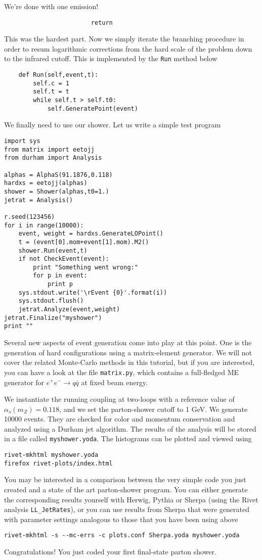 \documentclass[10pt,fleqn]{scrartcl}
\begin{document}
 We're done with one emission!
\begin{verbatim}
                        return    
\end{verbatim}
This was the hardest part. Now we simply iterate the branching procedure in order to
resum logarithmic corrections from the hard scale of the problem down to the infrared 
cutoff. This is implemented by the {\tt Run} method below
\begin{verbatim}
    def Run(self,event,t):
        self.c = 1
        self.t = t
        while self.t > self.t0:
            self.GeneratePoint(event)
\end{verbatim}
We finally need to use our shower. Let us write a simple test program
\begin{verbatim}
import sys
from matrix import eetojj
from durham import Analysis

alphas = AlphaS(91.1876,0.118)
hardxs = eetojj(alphas)
shower = Shower(alphas,t0=1.)
jetrat = Analysis()

r.seed(123456)
for i in range(10000):
    event, weight = hardxs.GenerateLOPoint()
    t = (event[0].mom+event[1].mom).M2()
    shower.Run(event,t)
    if not CheckEvent(event):
        print "Something went wrong:"
        for p in event:
            print p
    sys.stdout.write('\rEvent {0}'.format(i))
    sys.stdout.flush()
    jetrat.Analyze(event,weight)
jetrat.Finalize("myshower")
print ""
\end{verbatim}
Several new aspects of event generation come into play at this point.
One is the generation of hard configurations using a matrix-element
generator. We will not cover the related Monte-Carlo methods in this
tutorial, but if you are interested, you can have a look at the file
{\tt matrix.py}, which contains a full-fledged ME generator for 
$e^+e^-\to q\bar{q}$ at fixed beam energy.

We instantiate the running coupling at two-loops with a reference value
of $\alpha_s(m_Z)=0.118$, and we set the parton-shower cutoff to 1 GeV.
We generate 10000 events. They are checked for color and momentum
conservation and analyzed using a Durham jet algorithm. The results
of the analysis will be stored in a file called {\tt myshower.yoda}.
The histograms can be plotted and viewed using 
\begin{verbatim}
rivet-mkhtml myshower.yoda
firefox rivet-plots/index.html
\end{verbatim}
You may be interested in a comparison between the very simple code
you just created and a state of the art parton-shower program.
You can either generate the corresponding results yourself with
Herwig, Pythia or Sherpa (using the Rivet analysis {\tt LL\_JetRates}),
or you can use results from Sherpa that were generated with parameter
settings analogous to those that you have been using above
\begin{verbatim}
rivet-mkhtml -s --mc-errs -c plots.conf Sherpa.yoda myshower.yoda
\end{verbatim}
Congratulations! You just coded your first final-state parton shower.
\end{document}

